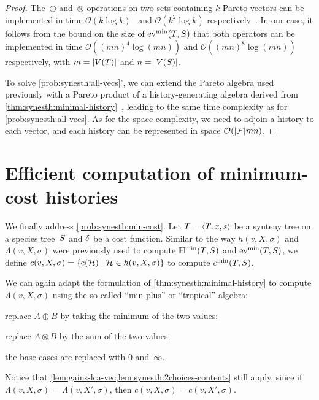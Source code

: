\begin{proof}
    The~\(\oplus\) and~\(\otimes\) operations on two sets containing \(k\) Pareto-vectors can be implemented in time \(\mathcal{O}(k\log k)\)~\parencite{Saule2015ParetoOptimizationAlgebraic} and \(\mathcal{O}(k^2\log k)\) respectively~\parencite{LibeskindHadas2014ParetoOptimalPhylogenetic}.
    In our case, it follows from the bound on the size of \(\mathrm{ev}^{\mathrm{min}}(T, S)\) that both operators can be implemented in time \(\mathcal{O}((mn)^4\log(mn))\) and \(\mathcal{O}((mn)^8\log(mn))\) respectively, with \(m = |V(T)|\) and \(n = |V(S)|\).

    To solve \cref*{prob:synesth:all-vecs}', we can extend the Pareto algebra used previously with a Pareto product of a history-generating algebra derived from \cref{thm:synesth:minimal-history}~\parencite{Saule2015ParetoOptimizationAlgebraic}, leading to the same time complexity as for \cref{prob:synesth:all-vecs}.
    As for the space complexity, we need to adjoin a history to each vector, and each history can be represented in space \(\mathcal{O}(|\mathcal{F}|mn)\).
\end{proof}

\section{Efficient computation of minimum-cost histories}\label{sec:synesth:min-cost-histories}

We finally address \cref{prob:synesth:min-cost}.
Let \(T = \left\langle T, x, s\right\rangle\) be a synteny tree on a species tree~\(S\) and \(\delta\kern.1pt\) be a cost function.
Similar to the way \(h(v, X, \sigma)\) and \(\Lambda(v, X, \sigma)\) were previously used to compute \(\mathbb{H}^{\mathrm{min}}(T, S)\) and \(\mathrm{ev}^{\mathrm{min}}(T, S)\), we define \(c(v, X, \sigma) = \{\mathrm{c}(\mathcal{H}) \mid \mathcal{H} \in h(v, X, \sigma)\}\) to compute \(c^{\mathrm{min}}(T, S)\).

We can again adapt the formulation of \cref{thm:synesth:minimal-history} to compute \(\Lambda(v, X, \sigma)\) using the so-called \enquote{min-plus} or \enquote{tropical} algebra: \begin{compactitemize}
    \item replace \(A \oplus B\) by taking the minimum of the two values;
    \item replace \(A \otimes B\) by the sum of the two values;
    \item the base cases are replaced with \(0\) and~\(\infty\).
\end{compactitemize}
Notice that \cref{lem:gains-lca-vec,lem:synesth:2choices-contents} still apply, since if \(\Lambda(v, X, \sigma)\) = \(\Lambda(v, X', \sigma)\), then \(c(v, X, \sigma) = c(v, X', \sigma)\).

